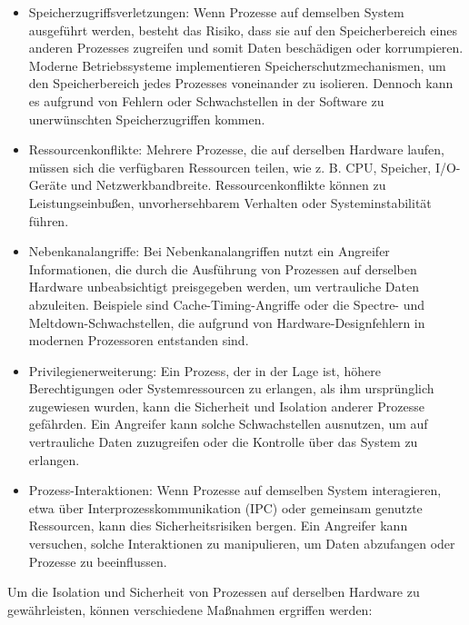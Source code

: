 \begin{itemize}
\item Speicherzugriffsverletzungen: Wenn Prozesse auf demselben System ausgeführt werden, besteht das Risiko, dass sie auf den Speicherbereich eines anderen Prozesses zugreifen und somit Daten beschädigen oder korrumpieren. Moderne Betriebssysteme implementieren Speicherschutzmechanismen, um den Speicherbereich jedes Prozesses voneinander zu isolieren. Dennoch kann es aufgrund von Fehlern oder Schwachstellen in der Software zu unerwünschten Speicherzugriffen kommen.
\item Ressourcenkonflikte: Mehrere Prozesse, die auf derselben Hardware laufen, müssen sich die verfügbaren Ressourcen teilen, wie z. B. CPU, Speicher, I/O-Geräte und Netzwerkbandbreite. Ressourcenkonflikte können zu Leistungseinbußen, unvorhersehbarem Verhalten oder Systeminstabilität führen.
\item Nebenkanalangriffe: Bei Nebenkanalangriffen nutzt ein Angreifer Informationen, die durch die Ausführung von Prozessen auf derselben Hardware unbeabsichtigt preisgegeben werden, um vertrauliche Daten abzuleiten. Beispiele sind Cache-Timing-Angriffe oder die Spectre- und Meltdown-Schwachstellen, die aufgrund von Hardware-Designfehlern in modernen Prozessoren entstanden sind.
\item Privilegienerweiterung: Ein Prozess, der in der Lage ist, höhere Berechtigungen oder Systemressourcen zu erlangen, als ihm ursprünglich zugewiesen wurden, kann die Sicherheit und Isolation anderer Prozesse gefährden. Ein Angreifer kann solche Schwachstellen ausnutzen, um auf vertrauliche Daten zuzugreifen oder die Kontrolle über das System zu erlangen.
\item Prozess-Interaktionen: Wenn Prozesse auf demselben System interagieren, etwa über Interprozesskommunikation (IPC) oder gemeinsam genutzte Ressourcen, kann dies Sicherheitsrisiken bergen. Ein Angreifer kann versuchen, solche Interaktionen zu manipulieren, um Daten abzufangen oder Prozesse zu beeinflussen.
\end{itemize}
Um die Isolation und Sicherheit von Prozessen auf derselben Hardware zu gewährleisten, können verschiedene Maßnahmen ergriffen werden:

